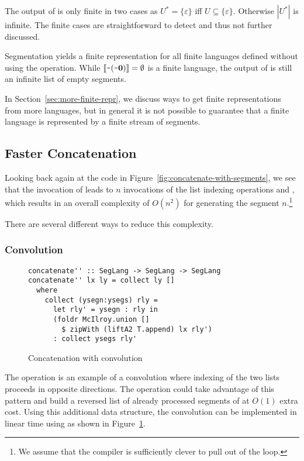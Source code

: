 The output of  is only finite in two cases as $U^* = \{\varepsilon\}$ iff
$U\subseteq\{\varepsilon\}$. Otherwise $|U^*|$ is infinite.
The finite cases are straightforward to detect and thus not further discussed.



Segmentation yields a finite representation for all finite languages
defined without using the  operation. While
$\llbracket\texttt{\textasciitilde}{(\texttt{\textasciitilde}{\mathbf0})}\rrbracket = \emptyset$ is a finite 
language, the output of  is still an
infinite list of empty segments.

In Section~\ref{sec:more-finite-repr}, we discuss ways to get finite
representations from more languages, but in general it is
not possible to guarantee that a finite language is represented by a
finite stream of segments.

\subsection{Faster Concatenation}
\label{sec:faster-concatenation}

Looking back again at the code in
Figure~\ref{fig:concatenate-with-segments}, we see that the
invocation of  leads to $n$ invocations of the list
indexing operations  and , which
results in an  overall complexity of $O (n^2)$ for generating the
segment $n$.\footnote{We assume that
the compiler is sufficiently clever to pull  out of the loop.}

There are several different ways to reduce this complexity.

\subsubsection{Convolution}
\label{sec:convolution}

\begin{figure}[tp]
\begin{lstlisting}
concatenate'' :: SegLang -> SegLang -> SegLang
concatenate'' lx ly = collect ly []
  where
    collect (ysegn:ysegs) rly =
      let rly' = ysegn : rly in
      (foldr McIlroy.union []
        $ zipWith (liftA2 T.append) lx rly')
      : collect ysegs rly'
\end{lstlisting}
  \caption{Concatenation with convolution}
  \label{fig:concatenation-with-convolution}
\end{figure}
The  operation is an example of a convolution where
indexing of the two lists proceeds in opposite directions. The  operation
could take advantage of this pattern and build a reversed list  of already
processed segments of  at $O(1)$ extra cost. Using this additional data structure, the
convolution can be implemented in linear time using
 as shown in Figure~\ref{fig:concatenation-with-convolution}.

